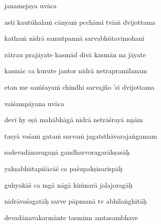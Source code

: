 \vers

janamejaya uvāca~{\dandab}\dontdisplaylinenum 

asti kautūhala\.m cānya\.m pcchāmi tvā\.m dvijottama\thinspace{\danda} \dontdisplaylinenum

katha\.m nidrā samutpannā sarvabhūtavimohanī \veg\dontdisplaylinenum

rātrau prajāyate kasmād divā kasmān na jāyate\thinspace{\dandab} \dontdisplaylinenum

kasmāc ca kurute jantor nidrā netrapramīlanam \danda\dontdisplaylinenum

etan me sa\.mśaya\.m chindhi sarvajño 'si dvijottama \veg\dontdisplaylinenum

vaiśampāyana uvāca~{\dandab}\dontdisplaylinenum 

devī hy eṣā mahābhāgā nidrā netrāśrayā nṇām\thinspace{\danda} \dontdisplaylinenum

tasyā vaśa\.m gata\.m sarva\.m jagatsthāvarajaṅgamam \veg\dontdisplaylinenum

sadevadānavagaṇā gandharvoragarākṣasāḥ\thinspace{\dandab} \dontdisplaylinenum

yakṣabhūtapiśācāś ca paśupakṣisarīspāḥ \veg\dontdisplaylinenum

guhyakāś ca mgā nāgā ki\.mnarā jalajoragāḥ\thinspace{\dandab} \dontdisplaylinenum

nidrāvaśagatāḥ sarve pāpmanā tv abhilaṅghitāḥ \veg\dontdisplaylinenum

devadānavakarmānte tasminn amtasambhave\thinspace{\dandab} \dontdisplaylinenum

